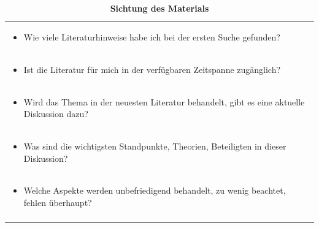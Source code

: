 \documentclass[]{book}
\providecommand{\tightlist}{%
  \setlength{\itemsep}{0pt}\setlength{\parskip}{0pt}}
\theoremstyle{definition}
\theoremstyle{definition}
\theoremstyle{definition}
\theoremstyle{remark}
\begin{document}
\begin{longtable}[]{@{}l@{}}
\caption{\textbf{\label{tab:sichten} Sichtung des Materials}}\tabularnewline
\toprule
\begin{minipage}[t]{0.97\columnwidth}\raggedright\strut
\begin{itemize}
\tightlist
\item
  Wie viele Literaturhinweise habe ich bei der ersten Suche gefunden?
  \vspace{-6mm}
\end{itemize}\strut
\end{minipage}\tabularnewline
\begin{minipage}[t]{0.97\columnwidth}\raggedright\strut
\begin{itemize}
\tightlist
\item
  Ist die Literatur für mich in der verfügbaren Zeitspanne zugänglich?
  \vspace{-6mm}
\end{itemize}\strut
\end{minipage}\tabularnewline
\begin{minipage}[t]{0.97\columnwidth}\raggedright\strut
\begin{itemize}
\tightlist
\item
  Wird das Thema in der neuesten Literatur behandelt, gibt es eine
  aktuelle Diskussion dazu? \vspace{-6mm}
\end{itemize}\strut
\end{minipage}\tabularnewline
\begin{minipage}[t]{0.97\columnwidth}\raggedright\strut
\begin{itemize}
\tightlist
\item
  Was sind die wichtigsten Standpunkte, Theorien, Beteiligten in dieser
  Diskussion? \vspace{-6mm}
\end{itemize}\strut
\end{minipage}\tabularnewline
\begin{minipage}[t]{0.97\columnwidth}\raggedright\strut
\begin{itemize}
\tightlist
\item
  Welche Aspekte werden unbefriedigend behandelt, zu wenig beachtet,
  fehlen überhaupt? \vspace{-6mm}
\end{itemize}\strut
\end{minipage}\tabularnewline
\begin{minipage}[t]{0.97\columnwidth}\raggedright\strut

\end{minipage}
\end{longtable}
\end{document}
